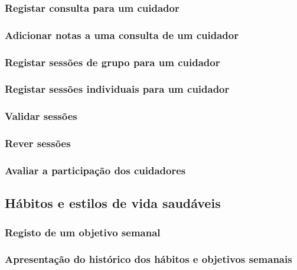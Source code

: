 \subsubsection{Registar consulta para um cuidador}
\subsubsection{Adicionar notas a uma consulta de um cuidador}
\subsubsection{Registar sessões de grupo para um cuidador}
\subsubsection{Registar sessões individuais para um cuidador}
\subsubsection{Validar sessões}
\subsubsection{Rever sessões}
\subsubsection{Avaliar a participação dos cuidadores}
\subsection{Hábitos e estilos de vida saudáveis}
\subsubsection{Registo de um objetivo semanal}
\subsubsection{Apresentação do histórico dos hábitos e objetivos semanais}
